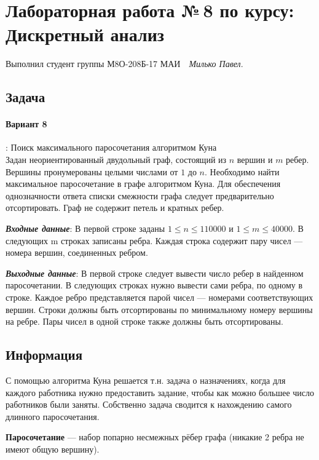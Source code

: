 \documentclass[12pt]{article}
\begin{document}
\section*{\centering Лабораторная работа №\,8 по курсу:\\ Дискретный анализ}

Выполнил студент группы М8О-208Б-17 МАИ \,\, \textit{Милько Павел}.

\subsection*{Задача}

\paragraph*{Вариант 8}: Поиск максимального паросочетания алгоритмом Куна\\
Задан неориентированный двудольный граф, состоящий из $n$ вершин и $m$ ребер.
Вершины пронумерованы целыми числами от $1$ до $n$. 
Необходимо найти максимальное паросочетание в графе алгоритмом Куна.
Для обеспечения однозначности ответа списки смежности графа следует предварительно отсортировать. Граф не содержит петель и кратных ребер.

\textit{ \textbf{Входные данные}}: 
В первой строке заданы $1 \le n \le 110000$ и $1 \le m \le 40000$. В следующих m
строках записаны ребра. Каждая строка содержит пару чисел --- номера
вершин, соединенных ребром.


\textit{ \textbf{Выходные данные}}: 
В первой строке следует вывести число ребер в найденном
паросочетании. В следующих строках нужно вывести сами ребра, по
одному в строке. Каждое ребро представляется парой чисел --- номерами
соответствующих вершин. Строки должны быть отсортированы по
минимальному номеру вершины на ребре. Пары чисел в одной строке
также должны быть отсортированы.

\subsection*{Информация}

С помощью алгоритма Куна решается т.н. задача о назначениях, когда для каждого работника нужно предоставить задание, чтобы как можно большее число работников были заняты. Собственно задача сводится к нахождению самого длинного паросочетания.

\textbf{Паросочетание} --- набор попарно несмежных рёбер графа (никакие 2 ребра не имеют общую вершину).
\end{document}
